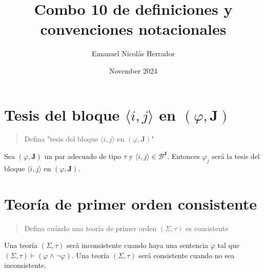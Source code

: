 \documentclass{article}
\title{Combo 10 de definiciones y convenciones notacionales}
\author{Emanuel Nicolás Herrador}
\date{November 2024}
\begin{document}
\maketitle

\section{Tesis del bloque $\langle i,j\rangle$ en $(\varphi,\mathbf{J})$}
\begin{quote}
  Defina "tesis del bloque $\langle i,j\rangle$ en $(\varphi,\mathbf{J})$"
\end{quote}
Sea $(\varphi,\mathbf{J})$ un par adecuado de tipo $\tau$ y $\langle i,j\rangle\in\mathcal{B}^\mathbf{J}$. Entonces $\varphi_j$ será la tesis del bloque $\langle i,j\rangle$ en $(\varphi,\mathbf{J})$.

\section{Teoría de primer orden consistente}
\begin{quote}
  Defina cuándo una teoría de primer orden $(\Sigma,\tau)$ es consistente
\end{quote}
Una teoría $(\Sigma,\tau)$ será inconsistente cuando haya una sentencia $\varphi$ tal que $(\Sigma,\tau)\vdash(\varphi\land\neg\varphi)$.
\newline
Una teoría $(\Sigma,\tau)$ será consistente cuando no sea inconsistente.
\end{document}
